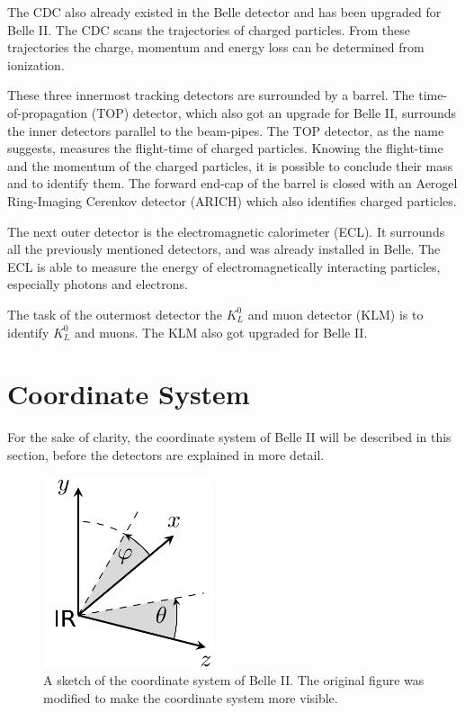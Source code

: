 \documentclass[a4paper,11pt,twosided,final,german,openbib,pdftex,listof=totoc,bibliography=totoc]{scrbook}
\begin{document}
The CDC also already existed in the Belle detector and has been upgraded for Belle II. The CDC scans the trajectories of charged particles. From these trajectories the charge, momentum and energy loss can be determined from ionization. 

These three innermost tracking detectors are surrounded by a barrel. The time-of-propagation (TOP) detector, which also got an upgrade for Belle II, surrounds the inner detectors parallel to the beam-pipes. The TOP detector, as the name suggests, measures the flight-time of charged particles. Knowing the flight-time and the momentum of the charged particles, it is possible to conclude their mass and to identify them. The forward end-cap of the barrel is closed with an Aerogel Ring-Imaging Cerenkov detector (ARICH) which also identifies charged particles.

The next outer detector is the electromagnetic calorimeter (ECL). It surrounds all the previously mentioned detectors, and was already installed in Belle. The ECL is able to measure the energy of electromagnetically interacting particles, especially photons and electrons.

The task of the outermost detector the $K_L^0$ and muon detector (KLM) is to identify $K_L^0$ and muons. The KLM also got upgraded for Belle II. \cite{B2B} 

\section{Coordinate System}

For the sake of clarity, the coordinate system of Belle II will be described in this section, before the detectors are explained in more detail.

\begin{figure}[h!]
	\begin{center}
		\includegraphics[width=5cm]{Bilder/coordinate.png}
	\end{center}
	\caption[Coordinate System Of Belle II]{A sketch of the coordinate system of Belle II. The original figure was modified to make the coordinate system more visible. \cite{TrackReconstruction}}
	\label{fig:CoordinateSysytem}
\end{figure}
\end{document}
